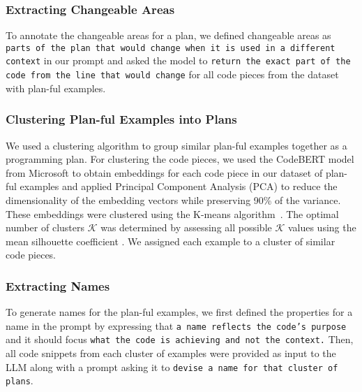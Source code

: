 \subsubsection*{Extracting Changeable Areas}To annotate the changeable areas for a plan, we defined changeable areas as \texttt{parts of the plan that would change when it is used in a different context} in our prompt and asked the model to \texttt{return the exact part of the code from the line that would change} for all code pieces from the dataset with plan-ful examples.

\subsubsection{Clustering Plan-ful Examples into Plans}
\label{sec:clustering}

We used a clustering algorithm to group similar plan-ful examples together as a programming plan. For clustering the code pieces, we used the CodeBERT model from Microsoft \cite{codebert} to obtain embeddings for each code piece in our dataset of plan-ful examples
and applied Principal Component Analysis (PCA) \cite{PCAanalysis} to reduce the dimensionality of the embedding vectors while preserving 90\% of the variance. These embeddings were clustered using the K-means algorithm~\cite{kmeansclustering}. The optimal number of clusters \(\mathcal{K}\) was determined by assessing all possible \(\mathcal{K}\) values 
using the mean silhouette coefficient \cite{silhouettecoeff}. We assigned each example 
to a cluster of similar code pieces. 

\subsubsection*{Extracting Names}
To generate names for the plan-ful examples, we first defined the properties for a name in the prompt by expressing that \texttt{a name reflects the code's purpose} and it should focus \texttt{what the code is achieving and not the context.} Then, all code snippets from each cluster of examples were provided as input to the LLM along with a prompt asking it to \texttt{devise a name for that cluster of plans}.